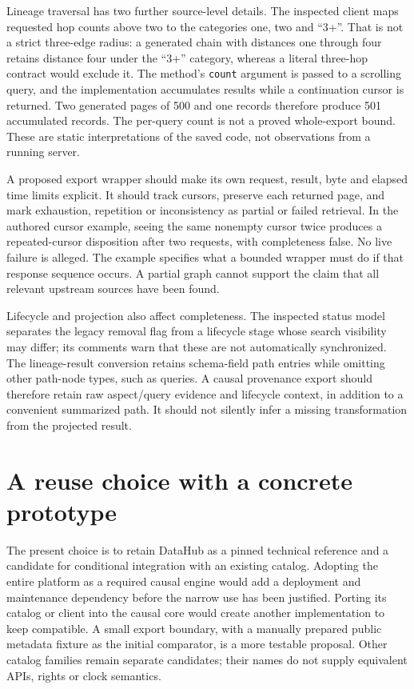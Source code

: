 Lineage traversal has two further source-level details. The inspected client
maps requested hop counts above two to the categories one, two and ``3+''.
That is not a strict three-edge radius: a generated chain with distances
one through four retains distance four under the ``3+'' category, whereas a
literal three-hop contract would exclude it. The method's \texttt{count}
argument is passed to a scrolling query, and the implementation accumulates
results while a continuation cursor is returned. Two generated pages of 500
and one records therefore produce 501 accumulated records. The per-query
count is not a proved whole-export bound. These are static interpretations
of the saved code, not observations from a running server.
\citep{exec16_dh_primary,exec16_dh_exact}

A proposed export wrapper should make its own request, result, byte and elapsed
time limits explicit. It should track cursors, preserve each returned page,
and mark exhaustion, repetition or inconsistency as partial or failed retrieval.
In the authored cursor example, seeing the same nonempty cursor twice produces
a repeated-cursor disposition after two requests, with completeness false.
No live failure is alleged. The example specifies what a bounded wrapper must
do if that response sequence occurs. A partial graph cannot support the
claim that all relevant upstream sources have been found.
\citep{exec16_dh_exact,exec16_dh_contract}

Lifecycle and projection also affect completeness. The inspected status model
separates the legacy removal flag from a lifecycle stage whose search visibility
may differ; its comments warn that these are not automatically synchronized.
The lineage-result conversion retains schema-field path entries while omitting
other path-node types, such as queries. A causal provenance export should
therefore retain raw aspect/query evidence and lifecycle context, in addition
to a convenient summarized path. It should not silently infer a missing
transformation from the projected result. \citep{exec16_dh_primary}

\section{A reuse choice with a concrete prototype}

The present choice is to retain DataHub as a pinned technical reference and
a candidate for conditional integration with an existing catalog. Adopting
the entire platform as a required causal engine would add a deployment and
maintenance dependency before the narrow use has been justified. Porting its
catalog or client into the causal core would create another implementation
to keep compatible. A small export boundary, with a manually prepared public
metadata fixture as the initial comparator, is a more testable proposal.
Other catalog families remain separate candidates; their names do not supply
equivalent APIs, rights or clock semantics. \citep{exec16_dh_contract}

